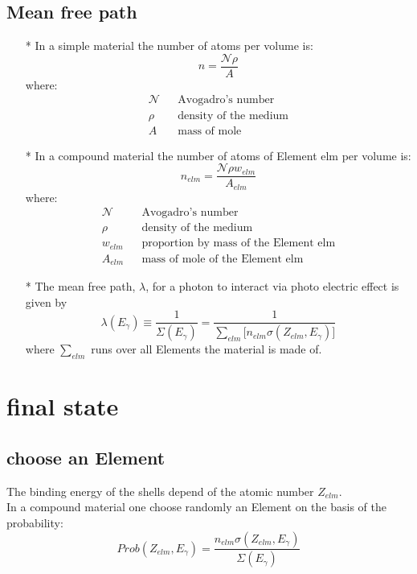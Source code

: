 \subsection{Mean free path}

\begin{itemize}
\item[*]
         In a simple material the number of atoms per volume is:
         \[n  = \frac{\mathcal{N}\rho}{A}\]
         where:
         \begin{eqnarray*}
          \mathcal{N} &  & \mbox{Avogadro's number} \\
          \rho        &  & \mbox{density of the medium} \\
          A           &  & \mbox{mass of mole} 
         \end{eqnarray*}
\item[*]
         In a compound material the number of atoms of Element elm per volume is:
         \[n_{elm}  = \frac{\mathcal{N}\rho w_{elm}}{A_{elm}}\]
         where:
         \begin{eqnarray*}
          \mathcal{N} &  & \mbox{Avogadro's number} \\
          \rho        &  & \mbox{density of the medium} \\
          w_{elm}     &  & \mbox{proportion by mass of the Element elm}\\
          A_{elm}     &  & \mbox{mass of mole of the Element elm} 
         \end{eqnarray*} 
\item[*] 
         The mean free path, $\lambda$, for a photon to interact via photo electric
         effect is given by
         \[
           \lambda(E_{\gamma}) \equiv \frac{1}{\Sigma (E_{\gamma})} 
             = \frac{1}{\sum_{elm}{\lbrack n_{elm} \sigma(Z_{elm},E_{\gamma})\rbrack}}
         \]
         where $\sum_{elm}$ runs over all Elements the material is made of.
\end{itemize}

\section{final state}
\subsection{choose an Element}
The binding energy of the shells depend of the atomic number $Z_{elm}$. \\
In a compound material one choose randomly an Element on the basis of the
probability:
\[
  Prob(Z_{elm},E_{\gamma}) = 
                      \frac{n_{elm} \sigma(Z_{elm},E_{\gamma})}{\Sigma (E_{\gamma})}
\]
